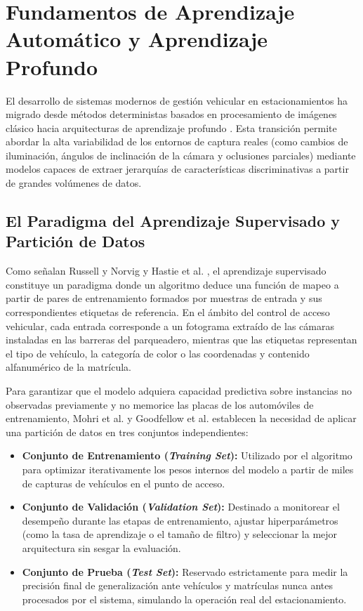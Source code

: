 \section{Fundamentos de Aprendizaje Automático y Aprendizaje Profundo}

El desarrollo de sistemas modernos de gestión vehicular en estacionamientos ha
migrado desde métodos deterministas basados en procesamiento de imágenes clásico
hacia arquitecturas de aprendizaje profundo \cite{voulodimos2018deep}. Esta transición permite abordar la
alta variabilidad de los entornos de captura reales (como cambios de iluminación,
ángulos de inclinación de la cámara y oclusiones parciales) mediante modelos
capaces de extraer jerarquías de características discriminativas a partir de
grandes volúmenes de datos.

\subsection{El Paradigma del Aprendizaje Supervisado y Partición de Datos}

Como señalan Russell y Norvig \cite{russell2020artificial} y Hastie et al.
\cite{hastie2009elements}, el aprendizaje
supervisado constituye un paradigma donde un algoritmo deduce una función de
mapeo a partir de pares de entrenamiento formados por muestras de entrada y sus
correspondientes etiquetas de referencia. En el ámbito del control de acceso
vehicular, cada entrada corresponde a un fotograma extraído de las cámaras
instaladas en las barreras del parqueadero, mientras que las etiquetas
representan el tipo de vehículo, la categoría de color o las coordenadas y
contenido alfanumérico de la matrícula.

Para garantizar que el modelo adquiera capacidad predictiva sobre instancias no
observadas previamente y no memorice las placas de los automóviles de
entrenamiento, Mohri et al. \cite{mohri2018foundations} y Goodfellow et al.
\cite{goodfellow2016deep} establecen la necesidad de aplicar una partición de
datos en tres conjuntos independientes:

\begin{itemize}
    \item \textbf{Conjunto de Entrenamiento (\textit{Training Set}):} Utilizado
        por el algoritmo para optimizar iterativamente los pesos internos del
        modelo a partir de miles de capturas de vehículos en el punto de acceso.

    \item \textbf{Conjunto de Validación (\textit{Validation Set}):} Destinado a
        monitorear el desempeño durante las etapas de entrenamiento, ajustar
        hiperparámetros (como la tasa de aprendizaje o el tamaño de filtro) y
        seleccionar la mejor arquitectura sin sesgar la evaluación.

    \item \textbf{Conjunto de Prueba (\textit{Test Set}):} Reservado
        estrictamente para medir la precisión final de generalización ante
        vehículos y matrículas nunca antes procesados por el sistema, simulando
        la operación real del estacionamiento.
\end{itemize}

